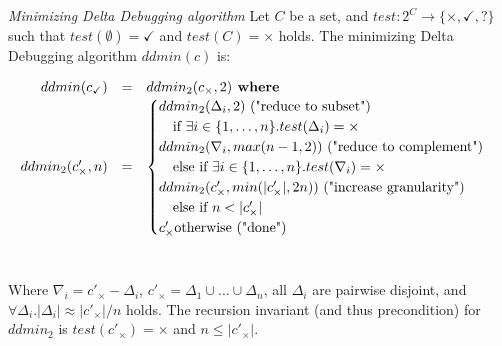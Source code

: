\begin{definition}\label{def:ddmin}\emph{Minimizing Delta Debugging algorithm}
Let $C$ be a set, and $test:2^C\rightarrow \{\times, \checkmark, ?\}$ such that
$test(\emptyset)=\checkmark$ and $test(C)=\times$ holds.  The minimizing Delta
Debugging algorithm $ddmin(c)$ is:
\begin{footnotesize}
\[
\begin{array}{r c l}
ddmin(c_\checkmark) & = & ddmin_2(c_\times , 2) \textbf{ where}\\
ddmin_2(c'_\times, n) & = & 
  \begin{cases}
  ddmin_2(\Delta_i, 2) \text{ ("reduce to subset")}\\
  \quad \text{if } \exists i \in \{1,\ldots,n\}.test(\Delta_i) = \times \\
  ddmin_2(\nabla_i, max(n-1, 2)) \text{ ("reduce to complement")}\\
  \quad \text{else if } \exists i \in \{1,\ldots,n\}.test(\nabla_i) = \times \\  
  ddmin_2(c'_\times, min(|c'_\times|, 2n)) \text{ ("increase granularity")}\\
  \quad \text{else if } n < |c'_\times|\\    
  c'_\times \text{otherwise ("done")}\\    
  \end{cases}
\end{array}  
\]\\
\end{footnotesize}
Where $\nabla_i = c'_\times - \Delta_i$, $c'_\times = \Delta_1 \cup \ldots \cup \Delta_n$, all
$\Delta_i$ are pairwise disjoint, and $\forall \Delta_i. |\Delta_i| \approx |c'_\times|/n$ holds.
The recursion invariant (and thus precondition) for $ddmin_2$ is $test(c'_\times) = \times$
and $n \leq |c'_\times|$.
\end{definition}